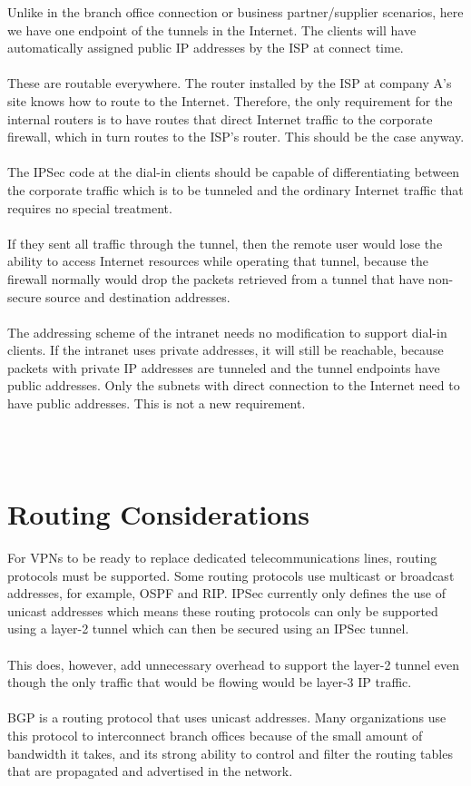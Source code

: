 \documentclass[10pt,a4paper]{article}
\begin{document}
\begin{itemize}
\begin{itemize}
\begin{itemize}
Unlike in the branch office connection or business partner/supplier scenarios,
here we have one endpoint of the tunnels in the Internet. The clients will have
automatically assigned public IP addresses by the ISP at connect time. 
\\
\\
These are
routable everywhere. The router installed by the ISP at company A's site knows
how to route to the Internet. Therefore, the only requirement for the internal
routers is to have routes that direct Internet traffic to the corporate firewall, which
in turn routes to the ISP's router. This should be the case anyway.
\\
\\
The IPSec code at the dial-in clients should be capable of differentiating between
the corporate traffic which is to be tunneled and the ordinary Internet traffic that
requires no special treatment. 
\\
\\
If they sent all traffic through the tunnel, then the
remote user would lose the ability to access Internet resources while operating
that tunnel, because the firewall normally would drop the packets retrieved from a
tunnel that have non-secure source and destination addresses.
\\
\\
The addressing scheme of the intranet needs no modification to support dial-in
clients. If the intranet uses private addresses, it will still be reachable, because
packets with private IP addresses are tunneled and the tunnel endpoints have
public addresses. Only the subnets with direct connection to the Internet need to
have public addresses. This is not a new requirement.

\\
\\



\newpage
\section{Routing Considerations}
For VPNs to be ready to replace dedicated telecommunications lines, routing
protocols must be supported. Some routing protocols use multicast or broadcast
addresses, for example, OSPF and RIP. IPSec currently only defines the use of
unicast addresses which means these routing protocols can only be supported
using a layer-2 tunnel which can then be secured using an IPSec tunnel.
\\
\\
This
does, however, add unnecessary overhead to support the layer-2 tunnel even
though the only traffic that would be flowing would be layer-3 IP traffic.
\\
\\
BGP is a routing protocol that uses unicast addresses. Many organizations use
this protocol to interconnect branch offices because of the small amount of
bandwidth it takes, and its strong ability to control and filter the routing tables that
are propagated and advertised in the network.

\end{itemize}
\end{itemize}
\end{itemize}
\end{document}
